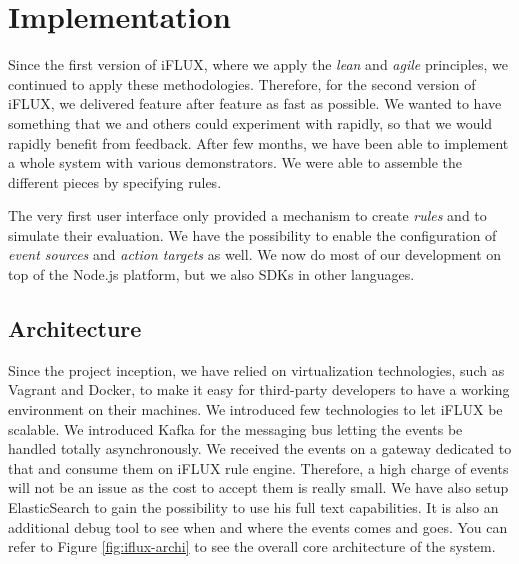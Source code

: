 \section{Implementation}

Since the first version of iFLUX, where we apply the \emph{lean} and \emph{agile} principles, we continued to apply these methodologies. Therefore, for the second version of iFLUX, we delivered feature after feature as fast as possible. We wanted to have something that we and others could experiment with rapidly, so that we would rapidly benefit from feedback. After few months, we have been able to implement a whole system with various demonstrators. We were able to assemble the different pieces by specifying rules. 

The very first user interface only provided a mechanism to create \emph{rules} and to simulate their evaluation. We have the possibility to enable the configuration of \emph{event sources} and \emph{action targets} as well. We now do most of our development on top of the Node.js platform, but we also SDKs in other languages.

\subsection{Architecture}

Since the project inception, we have relied on virtualization technologies, such as Vagrant and Docker, to make it easy for third-party developers to have a working environment on their machines. We introduced few technologies to let iFLUX be scalable. We introduced Kafka for the messaging bus letting the events be handled totally asynchronously. We received the events on a gateway dedicated to that and consume them on iFLUX rule engine. Therefore, a high charge of events will not be an issue as the cost to accept them is really small. We have also setup ElasticSearch to gain the possibility to use his full text capabilities. It is also an additional debug tool to see when and where the events comes and goes. You can refer to Figure \ref{fig:iflux-archi} to see the overall core architecture of the system.

